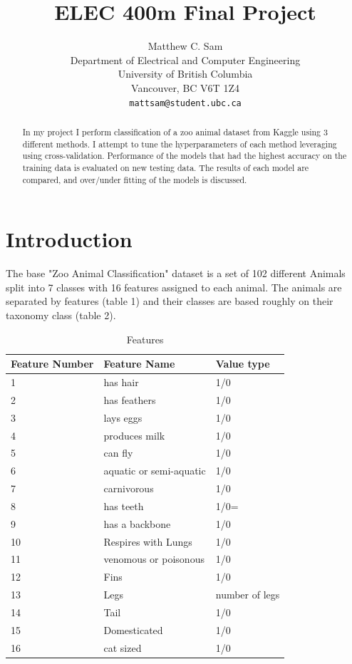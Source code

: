 \documentclass{article}
\title{ELEC 400m Final Project}
\author{%
  Matthew C. Sam \\
  Department of Electrical and Computer Engineering\\
  University of British Columbia\\
  Vancouver, BC V6T 1Z4\\
  \texttt{mattsam@student.ubc.ca} \\
}
\begin{document}
\maketitle
\begin{abstract}
    In my project I perform classification of a zoo animal dataset from Kaggle using 3 different methods. I attempt to tune the hyperparameters of each method leveraging using cross-validation. Performance of the models that had the highest accuracy on the training data is evaluated on new testing data. The results of each model are compared, and over/under fitting of the models is discussed.
\end{abstract}

\section{Introduction}
    The base "Zoo Animal Classification" dataset is a set of 102 different Animals split into 7 classes with 16 features assigned to each animal. The animals are separated by features (table 1) and their classes are based roughly on their taxonomy class (table 2).
    \begin{table}[H]
      \caption{Features}
      \label{feature-table}
      \centering
      \begin{tabular}{lll}
        \cmidrule(r){1-2}
        Feature Number & Feature Name   & Value type          \\
        \midrule
        1    & has hair                 & 1/0               \\
        2    & has feathers             & 1/0               \\
        3    & lays eggs                & 1/0               \\
        4    & produces milk            & 1/0               \\
        5    & can fly                  & 1/0               \\
        6    & aquatic or semi-aquatic  & 1/0               \\
        7    & carnivorous              & 1/0               \\
        8    & has teeth                & 1/0=              \\
        9    & has a backbone           & 1/0               \\
        10   & Respires with Lungs      & 1/0               \\
        11   & venomous or poisonous    & 1/0               \\
        12   & Fins                     & 1/0               \\
        13   & Legs                     & number of legs    \\
        14   & Tail                     & 1/0               \\
        15   & Domesticated             & 1/0               \\
        16   & cat sized                & 1/0               \\
        \bottomrule
      \end{tabular}
    \end{table}
\end{document}
